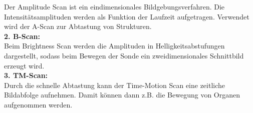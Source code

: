 Der Amplitude Scan ist ein eindimensionales Bildgebungsverfahren. Die Intensitätsamplituden werden als Funktion
der Laufzeit aufgetragen. Verwendet wird der A-Scan zur Abtastung von Strukturen.\\
\textbf{2. B-Scan:}\\
Beim Brightness Scan werden die Amplituden in Helligkeitsabstufungen
dargestellt, sodass beim Bewegen der Sonde ein zweidimensionales Schnittbild erzeugt wird.\\
\textbf{3. TM-Scan:}\\
Durch die schnelle Abtastung kann der Time-Motion Scan eine zeitliche Bildabfolge aufnehmen. Damit können dann
z.B. die  Bewegung von Organen aufgenommen werden.\\
